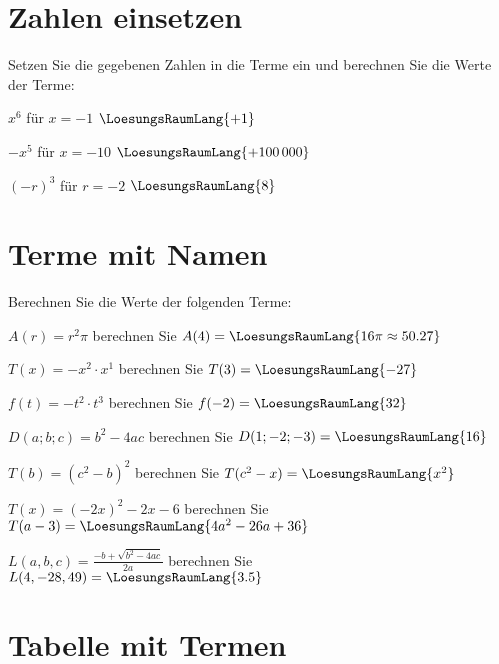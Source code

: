 \newpage


\section{Zahlen einsetzen}
Setzen Sie die gegebenen Zahlen in die Terme ein und berechnen Sie die
Werte der Terme:

\begin{bbwAufgabenBlock}
\item $x^6$ für $x=-1$ $\LoesungsRaumLang{+1}$
\item $-x^5$ für $x=-10$ $\LoesungsRaumLang{+100\,000}$
\item $(-r)^3$ für $r=-2$ $\LoesungsRaumLang{8}$
\end{bbwAufgabenBlock}
\newpage

\section{Terme mit Namen}
Berechnen Sie die Werte der folgenden Terme:

\begin{bbwAufgabenBlock}
\item $A(r)=r^2\pi$ berechnen Sie $A(4)= \LoesungsRaumLang{16\pi\approx{}50.27}$
\item $T(x)=-x^2\cdot{}x^1$ berechnen Sie $T(3)= \LoesungsRaumLang{-27}$
\item $f(t)=-t^2\cdot{}t^3$ berechnen Sie $f(-2)= \LoesungsRaumLang{32}$
\item $D(a;b;c)=b^2-4ac$ berechnen Sie $D(1;-2;-3)= \LoesungsRaumLang{16}$\newpage
\item $T(b)=(c^2-b)^2$ berechnen Sie $T(c^2-x)= \LoesungsRaumLang{x^2}$
\item $T(x)=(-2x)^2 -2x -6$ berechnen Sie $T(a-3)= \LoesungsRaumLang{4a^2-26a+36}$
\item $L(a,b,c)=\frac{-b+\sqrt{b^2-4ac}}{2a}$ berechnen Sie $L(4, -28, 49)= \LoesungsRaumLang{3.5}$
\end{bbwAufgabenBlock}
\newpage%

\section{Tabelle mit Termen}
\nextBbwAufgabenNummer{}

